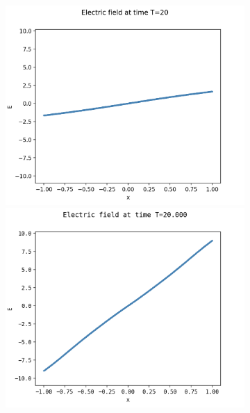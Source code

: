 \documentclass{article}
\numberwithin{equation}{section}
\newcommand{\imh}{\textheight} %
\newcommand{\imw}{\textwidth} %
\begin{document}
\begin{figure}
	\centering
	\newcommand{\rootSL}{../code_SL/}
	\newcommand{\rootFD}{../temp_res_DF/}
	\newcommand{\dirSL}{run_comp_short_time_2sp_Nx1000_Nvi2001_Nve2001_Nt6250}
	\newcommand{\dirFD}{run_comp_short_time_2sp_Nx1000_Nv2000_Nt6250}
	
	\renewcommand{\imh}{0.24\textheight}
	\renewcommand{\imw}{0.3\linewidth}
	
	\begin{subfigure}{\textwidth}
		\centering
		\includegraphics[height=\imh,width=\imw]{images/ET20_FD.png}
		\includegraphics[height=\imh,width=\imw]{images/ET20_512.png}

\end{subfigure}
\end{figure}
\end{document}
